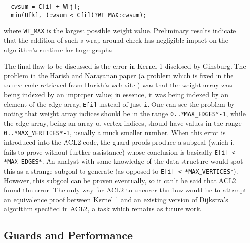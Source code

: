 \documentclass[copyright]{eptcs}
\begin{document}
\begin{verbatim} 
  cwsum = C[i] + W[j];
  min(U[k], (cwsum < C[i])?WT_MAX:cwsum);
\end{verbatim}

where \texttt{WT\_MAX} is the largest possible weight value.
Preliminary results indicate that the addition of such a wrap-around
check has negligible impact on the algorithm's runtime for large graphs.

The final flaw to be discussed is the error in Kernel 1 disclosed by
Ginsburg.  The problem in the Harish and Narayanan paper
\cite{Harish2007}  (a problem which is 
fixed in the source code retrieved from Harish's web site \cite{HarishWeb}) 
was that the weight array was being indexed by an improper value; 
in essence, it was being indexed 
by an element of the edge array, \texttt{E[i]} instead of just
\texttt{i}.  One can see the problem by noting that weight array
indices should be in the range \texttt{0..*MAX\_EDGES*-1}, 
while the edge array, being an array of vertex indices, should have 
values in the range \texttt{0..*MAX\_VERTICES*-1}, usually a much 
smaller number.  When this error is introduced into 
the ACL2 code, the guard proofs produce a subgoal 
(which it fails to prove without further assistance) whose conclusion 
is basically \texttt{E[i] < *MAX\_EDGES*}.  An analyst with some
knowledge of the data structure would spot this as a strange 
subgoal to generate (as opposed to \texttt{E[i] < *MAX\_VERTICES*}).  
However, this subgoal can be proven eventually, so it can't be said 
that ACL2 found the error.  The only way for ACL2 to uncover the flaw 
would be to attempt an equivalence proof between Kernel 1 and an 
existing version of Dijkstra's algorithm specified in ACL2, a task 
which remains as future work.

\subsection{Guards and Performance}
\end{document}
